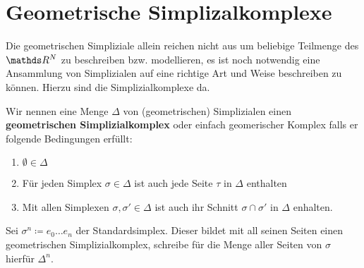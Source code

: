 
\section{Geometrische Simplizalkomplexe}

Die geometrischen Simpliziale allein reichen nicht aus um beliebige
Teilmenge des $\R^N$ zu beschreiben bzw. modellieren, es ist noch
notwendig eine Ansammlung von Simplizialen auf eine richtige Art und
Weise beschreiben zu können. Hierzu sind die Simplizialkomplexe da.

\begin{Def}
  Wir nennen eine Menge $\Delta$ von (geometrischen) Simplizialen
  einen \textbf{geometrischen Simplizialkomplex} oder einfach
  geomerischer Komplex falls er folgende Bedingungen erfüllt:
  \begin{enumerate}[(K1)]
  \item $\emptyset \in \Delta$
  \item Für jeden Simplex $\sigma \in \Delta$ ist auch jede Seite
    $\tau$ in $\Delta$ enthalten
  \item Mit allen Simplexen $\sigma, \sigma' \in \Delta$ ist auch ihr
    Schnitt $\sigma \cap \sigma'$ in $\Delta$ enhalten.
  \end{enumerate}
\end{Def}

\begin{Bsp}
  Sei $\sigma^n \coloneqq e_0 \ldots e_n $ der Standardsimplex.
  Dieser bildet mit all seinen Seiten einen geometrischen
  Simplizialkomplex, schreibe für die Menge aller Seiten von $\sigma$
  hierfür $\Delta^n$.
\end{Bsp}


